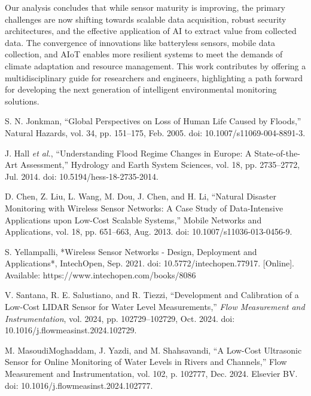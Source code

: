 Our analysis concludes that while sensor maturity is improving, the primary challenges are now shifting towards scalable data acquisition, robust security architectures, and the effective application of AI to extract value from collected data. The convergence of innovations like batteryless sensors, mobile data collection, and AIoT enables more resilient systems to meet the demands of climate adaptation and resource management. This work contributes by offering a multidisciplinary guide for researchers and engineers, highlighting a path forward for developing the next generation of intelligent environmental monitoring solutions.

\newpage
\begin{thebibliography}{00}

 S. N. Jonkman, 
``Global Perspectives on Loss of Human Life Caused by Floods,'' 
Natural Hazards, vol. 34, pp. 151--175, Feb. 2005. doi: 10.1007/s11069-004-8891-3.

 J. Hall \textit{et al.}, 
``Understanding Flood Regime Changes in Europe: A State-of-the-Art Assessment,'' 
Hydrology and Earth System Sciences, vol. 18, pp. 2735--2772, Jul. 2014. doi: 10.5194/hess-18-2735-2014.

 D. Chen, Z. Liu, L. Wang, M. Dou, J. Chen, and H. Li, 
``Natural Disaster Monitoring with Wireless Sensor Networks: A Case Study of Data-Intensive Applications upon Low-Cost Scalable Systems,'' 
Mobile Networks and Applications, vol. 18, pp. 651--663, Aug. 2013. doi: 10.1007/s11036-013-0456-9.

 S. Yellampalli, 
*Wireless Sensor Networks - Design, Deployment and Applications*, IntechOpen, Sep. 2021. doi: 10.5772/intechopen.77917. [Online]. Available: https://www.intechopen.com/books/8086

 V. Santana, R. E. Salustiano, and R. Tiezzi, ``Development and Calibration of a Low-Cost LIDAR Sensor for Water Level Measurements,'' \emph{Flow Measurement and Instrumentation}, vol. 2024, pp. 102729--102729, Oct. 2024. doi: 10.1016/j.flowmeasinst.2024.102729.

 M. MasoudiMoghaddam, J. Yazdi, and M. Shahsavandi, 
``A Low-Cost Ultrasonic Sensor for Online Monitoring of Water Levels in Rivers and Channels,'' 
Flow Measurement and Instrumentation, vol. 102, p. 102777, Dec. 2024. Elsevier BV. doi: 10.1016/j.flowmeasinst.2024.102777.


\end{thebibliography}
